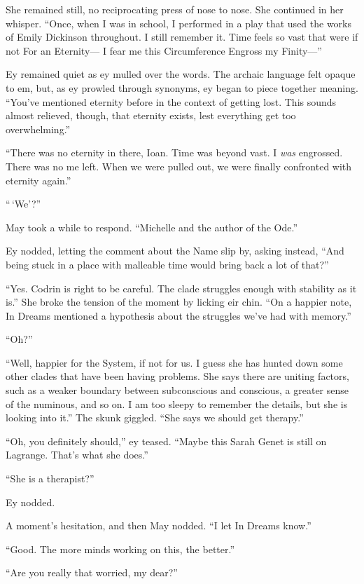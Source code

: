 She remained still, no reciprocating press of nose to nose. She continued in her whisper. ``Once, when I was in school, I performed in a play that used the works of Emily Dickinson throughout. I still remember it. Time feels so vast that were if not For an Eternity— I fear me this Circumference Engross my Finity—''

Ey remained quiet as ey mulled over the words. The archaic language felt opaque to em, but, as ey prowled through synonyms, ey began to piece together meaning. ``You've mentioned eternity before in the context of getting lost. This sounds almost relieved, though, that eternity exists, lest everything get too overwhelming.''

``There was no eternity in there, Ioan. Time was beyond vast. I \emph{was} engrossed. There was no me left. When we were pulled out, we were finally confronted with eternity again.''

``\,`We'?''

May took a while to respond. ``Michelle and the author of the Ode.''

Ey nodded, letting the comment about the Name slip by, asking instead, ``And being stuck in a place with malleable time would bring back a lot of that?''

``Yes. Codrin is right to be careful. The clade struggles enough with stability as it is.'' She broke the tension of the moment by licking eir chin. ``On a happier note, In Dreams mentioned a hypothesis about the struggles we've had with memory.''

``Oh?''

``Well, happier for the System, if not for us. I guess she has hunted down some other clades that have been having problems. She says there are uniting factors, such as a weaker boundary between subconscious and conscious, a greater sense of the numinous, and so on. I am too sleepy to remember the details, but she is looking into it.'' The skunk giggled. ``She says we should get therapy.''

``Oh, you definitely should,'' ey teased. ``Maybe this Sarah Genet is still on Lagrange. That's what she does.''

``She is a therapist?''

Ey nodded.

A moment's hesitation, and then May nodded. ``I let In Dreams know.''

``Good. The more minds working on this, the better.''

``Are you really that worried, my dear?''


